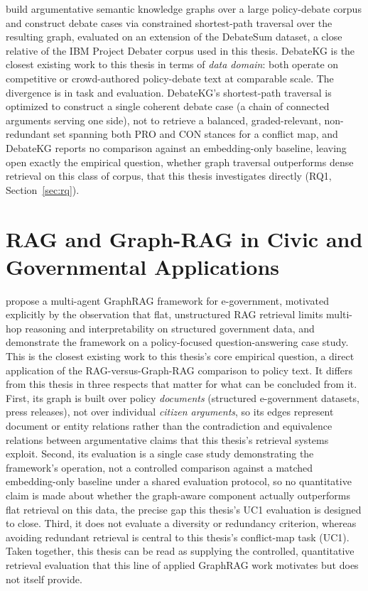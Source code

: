 \textcite{debatekg2023} build argumentative semantic knowledge graphs over a large policy-debate
corpus and construct debate cases via constrained shortest-path traversal over the resulting
graph, evaluated on an extension of the DebateSum dataset, a close relative of the IBM Project
Debater corpus used in this thesis. DebateKG is the closest existing work to this thesis in terms
of \emph{data domain}: both operate on competitive or crowd-authored policy-debate text at
comparable scale. The divergence is in task and evaluation. DebateKG's shortest-path traversal
is optimized to construct a single coherent debate case (a chain of connected arguments serving
one side), not to retrieve a balanced, graded-relevant, non-redundant set spanning both PRO and
CON stances for a conflict map, and DebateKG reports no comparison against an embedding-only
baseline, leaving open exactly the empirical question, whether graph traversal outperforms dense
retrieval on this class of corpus, that this thesis investigates directly (RQ1,
Section~\ref{sec:rq}).

\section{RAG and Graph-RAG in Civic and Governmental Applications}
\label{sec:rw-graphrag-civic}

\textcite{papageorgiou2025egovgraphrag} propose a multi-agent GraphRAG framework for e-government,
motivated explicitly by the observation that flat, unstructured RAG retrieval limits multi-hop
reasoning and interpretability on structured government data, and demonstrate the framework on a
policy-focused question-answering case study. This is the closest existing work to this thesis's
core empirical question, a direct application of the RAG-versus-Graph-RAG comparison to policy
text. It differs from this thesis in three respects that matter for what can be concluded from
it. First, its graph is built over policy \emph{documents} (structured e-government datasets,
press releases), not over individual \emph{citizen arguments}, so its edges represent document or
entity relations rather than the contradiction and equivalence relations between argumentative
claims that this thesis's retrieval systems exploit. Second, its evaluation is a single case
study demonstrating the framework's operation, not a controlled comparison against a matched
embedding-only baseline under a shared evaluation protocol, so no quantitative claim is made
about whether the graph-aware component actually outperforms flat retrieval on this data, the
precise gap this thesis's UC1 evaluation is designed to close. Third, it does not evaluate a
diversity or redundancy criterion, whereas avoiding redundant retrieval is central to this
thesis's conflict-map task (UC1). Taken together, this thesis can be read as supplying the
controlled, quantitative retrieval evaluation that this line of applied GraphRAG work motivates
but does not itself provide.

